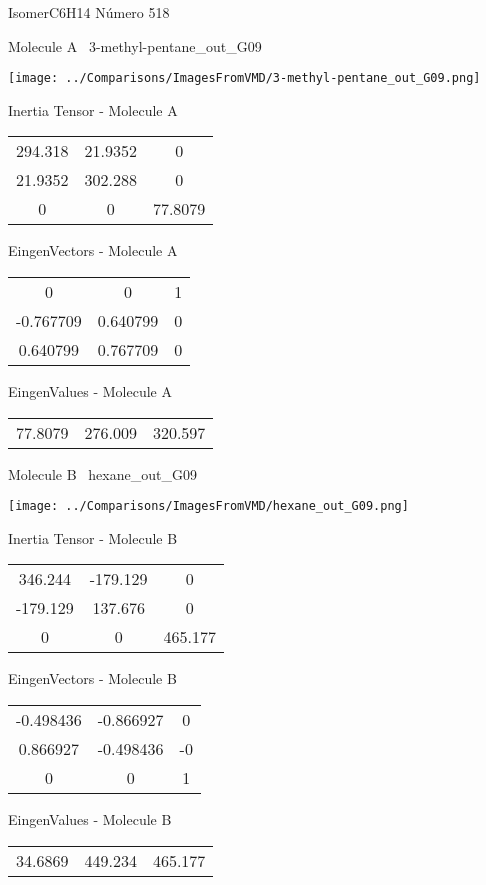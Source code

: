 \vtab[-3cm]
\begin{center}
{\large IsomerC6H14 \tab Número 518}
\end{center}
\begin{multicols}{2}
\begin{center}

Molecule A \
3-methyl-pentane\_out\_G09

\texttt{[image: ../Comparisons/ImagesFromVMD/3-methyl-pentane\_out\_G09.png]}

Inertia Tensor - Molecule A \\
\begin{tabular}{|c c c|}
294.318	 & 	21.9352	 & 	0	 \\
21.9352	 & 	302.288	 & 	0	 \\
0	 & 	0	 & 	77.8079
\end{tabular}

\vtab
 EingenVectors - Molecule A     \\
\begin{tabular}{|c c c|}
0	 & 	0	 & 	1	 \\
-0.767709	 & 	0.640799	 & 	0	 \\
0.640799	 & 	0.767709	 & 	0
\end{tabular}

\vtab
 EingenValues - Molecule A     \\
\begin{tabular}{|c c c|}
77.8079	 & 	276.009	 & 	320.597	 \\
\end{tabular}
\columnbreak

Molecule B \
hexane\_out\_G09

\texttt{[image: ../Comparisons/ImagesFromVMD/hexane\_out\_G09.png]}

Inertia Tensor - Molecule B \\
\begin{tabular}{|c c c|}
346.244	 & 	-179.129	 & 	0	 \\
-179.129	 & 	137.676	 & 	0	 \\
0	 & 	0	 & 	465.177
\end{tabular}

\vtab
 EingenVectors - Molecule B     \\
\begin{tabular}{|c c c|}
-0.498436	 & 	-0.866927	 & 	0	 \\
0.866927	 & 	-0.498436	 & 	-0	 \\
0	 & 	0	 & 	1
\end{tabular}

\vtab
 EingenValues - Molecule B     \\
\begin{tabular}{|c c c|}
34.6869	 & 	449.234	 & 	465.177	 \\
\end{tabular}

\end{center}
\end{multicols}

